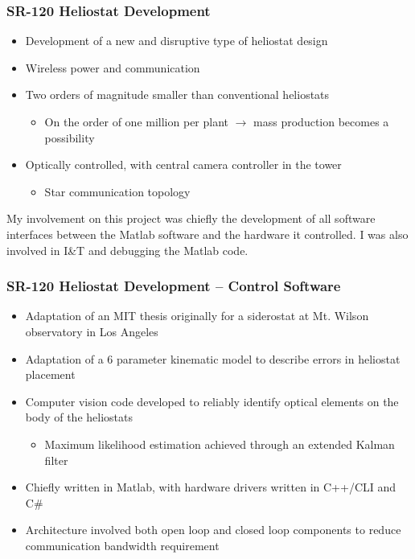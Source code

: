 \documentclass[aspectratio=169]{beamer}
\begin{document}
\begin{frame}
  \frametitle{SR-120 Heliostat Development}
  \begin{itemize}
  \item Development of a new and disruptive type of heliostat design
  \item Wireless power and communication
  \item Two orders of magnitude smaller than conventional heliostats
    \begin{itemize}
    \item On the order of one million per plant $\rightarrow$ mass
      production becomes a possibility
    \end{itemize}
  \item Optically controlled, with central camera controller in the tower
    \begin{itemize}
    \item Star communication topology
    \end{itemize}
  \end{itemize}
  My involvement on this project was chiefly the development of all software interfaces between the Matlab software and the hardware it controlled.  I was also involved in I\&T and debugging the Matlab code.
\end{frame}

\begin{frame}
  \frametitle{SR-120 Heliostat Development -- Control Software}
    \begin{itemize}
    \item Adaptation of an MIT thesis originally for a siderostat at Mt. Wilson observatory in Los Angeles
    \item Adaptation of a 6 parameter kinematic model to describe errors in heliostat placement
    \item Computer vision code developed to reliably identify optical elements on the body of the heliostats
      \begin{itemize}
      \item Maximum likelihood estimation achieved through an extended Kalman filter
      \end{itemize}
    \item Chiefly written in Matlab, with hardware drivers written in C++/CLI and C\#
    \item Architecture involved both open loop and closed loop components to reduce communication bandwidth requirement
    \end{itemize}
\end{frame}
\end{document}
